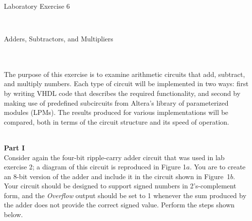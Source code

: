 \documentclass[psfig,10pt,fullpage]{article}
\begin{document}
~\\
~\\
~\\
\centerline{\huge Laboratory Exercise 6}
~\\
\centerline{\large Adders, Subtractors, and Multipliers}
~\\
~\\

The purpose of this exercise is to examine arithmetic circuits that add, subtract,
and multiply numbers. Each type of circuit will be implemented in two ways: first by writing
VHDL code that describes the required functionality, and second by making use
of predefined subcircuits from Altera's library of parameterized modules (LPMs). The
results produced for various implementations will be compared, both in terms of the circuit
structure and its speed of operation.

~\\
\noindent
{\bf Part I}
~\\

\noindent
Consider again the four-bit ripple-carry adder circuit that was used in lab exercise 2;
a diagram of this circuit is reproduced in Figure 1$a$. You are to create an 8-bit 
version of the adder and include it in the circuit shown in Figure~1$b$. Your circuit
should be designed to support signed numbers in 2's-complement form, and 
the {\it Overflow} output should be set to 1 whenever the sum
produced by the adder does not provide the correct signed value. Perform the 
steps shown below.
\end{document}

